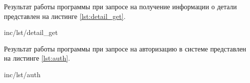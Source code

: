 Результат работы программы при запросе на получение информации о детали представлен на листинге \ref{lst:detail_get}.

\begin{lstinputlisting}[label=lst:detail_get,caption=Получение информации о детали, language=c]{inc/lst/detail_get}
\end{lstinputlisting}

Результат работы программы при запросе на авторизацию в системе представлен на листинге \ref{lst:auth}.
\newpage
\begin{lstinputlisting}[label=lst:auth,caption=Авторизация в системе, language=c]{inc/lst/auth}
\end{lstinputlisting}
